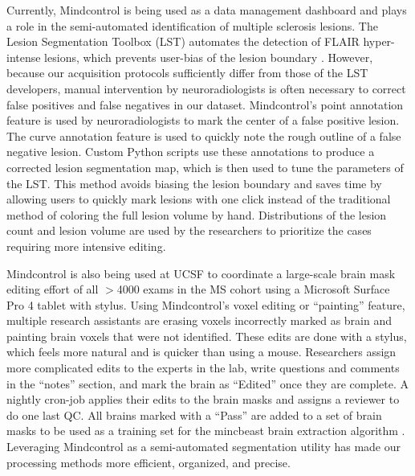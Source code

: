 Currently, Mindcontrol is being used as a data management dashboard and plays a role in the semi-automated identification of multiple sclerosis lesions. The Lesion Segmentation Toolbox (LST) automates the detection of FLAIR hyper-intense lesions, which prevents user-bias of the lesion boundary \cite{Schmidt_2012}. However, because our acquisition protocols sufficiently differ from those of the LST developers, manual intervention by neuroradiologists is often necessary to correct false positives and false negatives in our dataset. Mindcontrol's point annotation feature is used by neuroradiologists to mark the center of a false positive lesion. The curve annotation feature is used to quickly note the rough outline of a false negative lesion. Custom Python scripts use these annotations to produce a corrected lesion segmentation map, which is then used to tune the parameters of the LST. This method avoids biasing the lesion boundary and saves time by allowing users to quickly mark lesions with one click instead of the traditional method of coloring the full lesion volume by hand. Distributions of the lesion count and lesion volume are used by the researchers to prioritize the cases requiring more intensive editing.

Mindcontrol is also being used at UCSF to coordinate a large-scale brain mask editing effort of all $>$4000 exams in the MS cohort using a Microsoft Surface Pro 4 tablet with stylus. Using Mindcontrol's voxel editing or ``painting'' feature, multiple research assistants are erasing voxels incorrectly marked as brain and painting brain voxels that were not identified.  These edits are done with a stylus, which feels more natural and is quicker than using a mouse. Researchers assign more complicated edits to the experts in the lab, write questions and comments in the ``notes'' section, and mark the brain as ``Edited'' once they are complete. A nightly cron-job applies their edits to the brain masks and assigns a reviewer to do one last QC. All brains marked with a ``Pass'' are added to a set of brain masks to be  used as a training set for the mincbeast brain extraction algorithm \cite{eskildsen2012beast}. Leveraging Mindcontrol as a semi-automated segmentation utility has made our processing methods more efficient, organized, and precise.